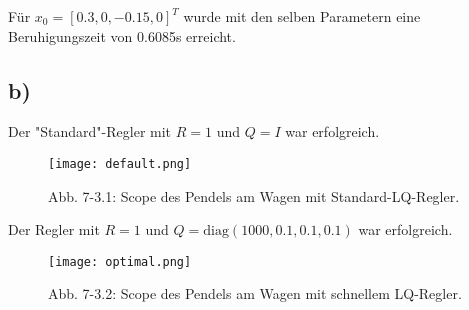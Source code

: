 \documentclass[11pt]{scrartcl} %
\begin{document}
Für $x_0=\left[ 0.3, 0, -0.15, 0 \right]^T$ wurde mit den selben Parametern eine Beruhigungszeit von 0.6085s erreicht.

\subsection*{b)}
Der "Standard"-Regler mit $R=1$ und $Q=\mathit{I}$ war erfolgreich.

\begin{figure}[H]
\centering
\texttt{[image: default.png]}
\captionsetup{labelformat=empty}
\caption{Abb. 7-3.1: Scope des Pendels am Wagen mit Standard-LQ-Regler.}
\end{figure}




Der Regler mit $R=1$ und $Q=\text{diag}(1000, 0.1, 0.1, 0.1)$ war erfolgreich.
\begin{figure}[H]
\centering
\texttt{[image: optimal.png]}
\captionsetup{labelformat=empty}
\caption{Abb. 7-3.2: Scope des Pendels am Wagen mit schnellem LQ-Regler.}
\end{figure}
\end{document}
